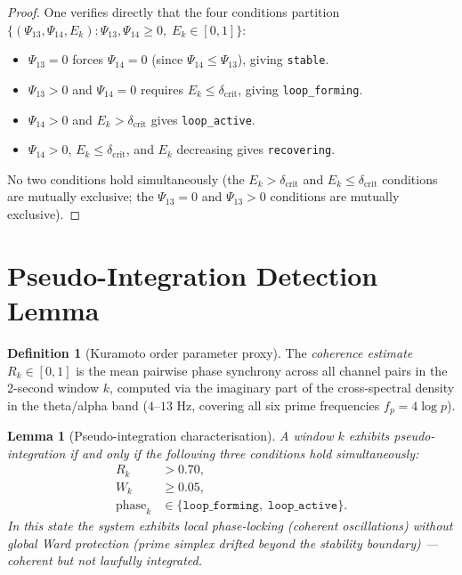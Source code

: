 \documentclass[12pt,a4paper]{article}
\theoremstyle{plain}
\newtheorem{lemma}[theorem]{Lemma}
\theoremstyle{definition}
\newtheorem{definition}[theorem]{Definition}
\renewcommand{\Psi}{\varPsi}
\begin{document}
\begin{proof}
  One verifies directly that the four conditions partition
  $\{(\Psi_{13},\Psi_{14},E_k) : \Psi_{13},\Psi_{14}\ge0,\;E_k\in[0,1]\}$:
  \begin{itemize}
    \item $\Psi_{13}=0$ forces $\Psi_{14}=0$ (since $\Psi_{14}\le\Psi_{13}$),
          giving \texttt{stable}.
    \item $\Psi_{13}>0$ and $\Psi_{14}=0$ requires $E_k\le\delta_{\mathrm{crit}}$,
          giving \texttt{loop\_forming}.
    \item $\Psi_{14}>0$ and $E_k>\delta_{\mathrm{crit}}$ gives \texttt{loop\_active}.
    \item $\Psi_{14}>0$, $E_k\le\delta_{\mathrm{crit}}$, and $E_k$ decreasing gives
          \texttt{recovering}.
  \end{itemize}
  No two conditions hold simultaneously (the $E_k>\delta_{\mathrm{crit}}$ and
  $E_k\le\delta_{\mathrm{crit}}$ conditions are mutually exclusive; the
  $\Psi_{13}=0$ and $\Psi_{13}>0$ conditions are mutually exclusive).
\end{proof}

\section{Pseudo-Integration Detection Lemma}
\label{sec:pseudo}

\begin{definition}[Kuramoto order parameter proxy]
  \label{def:kuramoto}
  The \emph{coherence estimate} $R_k\in[0,1]$ is the mean pairwise phase
  synchrony across all channel pairs in the 2-second window $k$, computed
  via the imaginary part of the cross-spectral density in the theta/alpha
  band ($4$--$13$ Hz, covering all six prime frequencies
  $f_p = 4\log p$).
\end{definition}

\begin{lemma}[Pseudo-integration characterisation]
  \label{lem:pseudo}
  A window $k$ exhibits \emph{pseudo-integration} if and only if the
  following three conditions hold simultaneously:
  \begin{align}
    R_k &> 0.70, \label{eq:pi1} \\
    W_k &\ge 0.05, \label{eq:pi2} \\
    \mathrm{phase}_k &\in \{\texttt{loop\_forming},\;\texttt{loop\_active}\}. \label{eq:pi3}
  \end{align}
  In this state the system exhibits local phase-locking (coherent
  oscillations) without global Ward protection (prime simplex drifted
  beyond the stability boundary) --- \emph{coherent but not lawfully
  integrated}.
\end{lemma}
\end{document}
